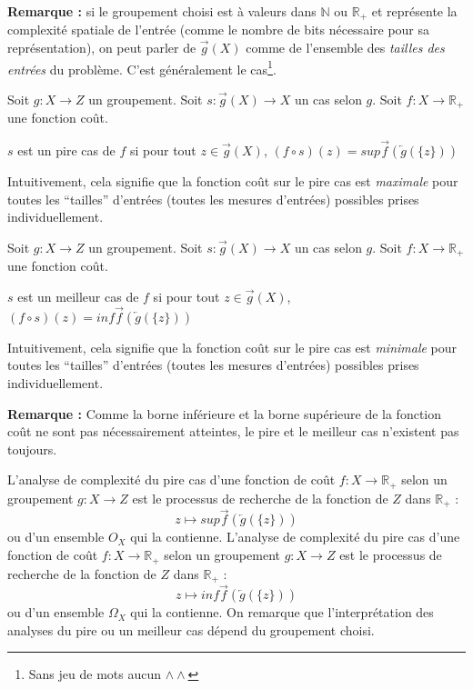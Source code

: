 \documentclass[../../../main.tex]{subfiles}
\begin{document}
\textbf{Remarque :} si le groupement choisi est à valeurs dans $\mathbb{N}$ ou $\mathbb{R}_+$ et représente la complexité spatiale de l'entrée (comme le nombre de bits nécessaire pour sa représentation), on peut parler de $\overrightarrow{g}(X)$ comme de l'ensemble des \textit{tailles des entrées} du problème. C'est généralement le cas\footnote{Sans jeu de mots aucun $\wedge\wedge$}.
 {
	Soit $g:X\rightarrow Z$ un groupement. Soit $s:\overrightarrow{g}(X)\rightarrow X$ un cas selon $g$. Soit $f:X\rightarrow \mathbb{R}_+$ une fonction coût. \newline

	$s$ est un pire cas de $f$ si pour tout $z\in\overrightarrow{g}(X)$, $(f\circ s)(z) = sup \overrightarrow{f}\left(\overleftarrow{g}\left(\{z\}\right)\right)$
}
Intuitivement, cela signifie que la fonction coût sur le pire cas est \textit{maximale} pour toutes les ``tailles'' d'entrées (toutes les mesures d'entrées) possibles prises individuellement.
 {
	Soit $g:X\rightarrow Z$ un groupement. Soit $s:\overrightarrow{g}(X)\rightarrow X$ un cas selon $g$. Soit $f:X\rightarrow \mathbb{R}_+$ une fonction coût. \newline

	$s$ est un meilleur cas de $f$ si pour tout $z\in\overrightarrow{g}(X)$, $(f\circ s)(z) = inf \overrightarrow{f}(\overleftarrow{g}(\{z\}))$
}
Intuitivement, cela signifie que la fonction coût sur le pire cas est \textit{minimale} pour toutes les ``tailles'' d'entrées (toutes les mesures d'entrées) possibles prises individuellement.

\textbf{Remarque :} Comme la borne inférieure et la borne supérieure de la fonction coût ne sont pas nécessairement atteintes, le pire et le meilleur cas n'existent pas toujours.

 {
	L'analyse de complexité du pire cas d'une fonction de coût $f:X\rightarrow \mathbb{R}_+$ selon un groupement $g:X\rightarrow Z$ est le processus de recherche de la fonction de $Z$ dans $\mathbb{R}_+$ :
	$$z\mapsto sup \overrightarrow{f}\left(\overleftarrow{g}\left(\{z\}\right)\right)$$
	ou d'un ensemble $O_X$ qui la contienne.
}
 {
	L'analyse de complexité du pire cas d'une fonction de coût $f:X\rightarrow \mathbb{R}_+$ selon un groupement $g:X\rightarrow Z$ est le processus de recherche de la fonction de $Z$ dans $\mathbb{R}_+$ :
	$$z\mapsto inf \overrightarrow{f}\left(\overleftarrow{g}\left(\{z\}\right)\right)$$
	ou d'un ensemble $\Omega_X$ qui la contienne.
}
On remarque que l'interprétation des analyses du pire ou un meilleur cas dépend du groupement choisi.
\end{document}
